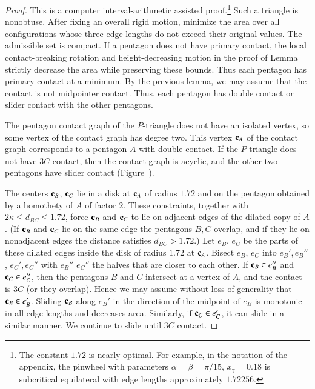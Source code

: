 \begin{proof} This is a computer interval-arithmetic assisted proof.\footnote{The constant
    $1.72$ is nearly optimal.  For example, in the notation of the
    appendix, the pinwheel with parameters $\alpha=\beta=\pi/15$,
    $x_\gamma = 0.18$ is subcritical equilateral with edge lengths
    approximately $1.72256$.} Such a triangle is nonobtuse.  After
  fixing an overall rigid motion, minimize the area over all configurations
  whose three edge lengths do not exceed their original values. The
  admissible set is compact. If a pentagon does not have primary contact,
  the local contact-breaking rotation and height-decreasing motion in the
  proof of Lemma~ strictly decrease the area while
  preserving these bounds. Thus each pentagon has primary contact at a
  minimum.
  By the previous lemma, we may assume that the
  contact is not midpointer contact.  Thus, each pentagon has double
  contact or slider contact with the other pentagons.

  The pentagon contact graph of the $P$-triangle does not have an isolated vertex, so some
  vertex of the contact graph has degree two. This vertex ${\mathbf c}_A$ of the
  contact graph corresponds to a pentagon $A$ with double contact.  If the
  $P$-triangle does not have $3C$ contact, then the contact graph is
  acyclic, and the other two pentagons have slider contact
  (Figure~).

  The centers ${\mathbf c}_B$, ${\mathbf c}_C$ lie in a disk at ${\mathbf c}_A$ of radius $1.72$ and
  on the pentagon obtained by a homothety of $A$ of factor $2$.  These
  constraints, together with $2\kappa\le d_{BC}\le1.72$, force ${\mathbf c}_B$
  and ${\mathbf c}_C$ to lie on adjacent edges of the dilated copy of $A$.  (If
  ${\mathbf c}_B$ and ${\mathbf c}_C$ lie on the same edge the pentagons $B,C$ overlap, and if they
  lie on nonadjacent edges the distance satisfies $d_{BC}>1.72$.) Let
  $e_B$, $e_C$ be the parts of these dilated edges inside the disk of
  radius $1.72$ at ${\mathbf c}_A$.  Bisect $e_B$, $e_C$ into $e_B',e_B''$,
  $e_C',e_C''$ with $e_B''$ $e_C''$ the halves that are closer to each
  other.  If ${\mathbf c}_B\in e_B''$ and ${\mathbf c}_C\in e_C''$, then the pentagons $B$
  and $C$ intersect at a vertex of $A$, and the contact is $3C$ (or
  they overlap).  Hence we may assume without loss of generality that
  ${\mathbf c}_B\in e_B'$.  Sliding ${\mathbf c}_B$ along $e_B'$ in the direction of the
  midpoint of $e_B$ is monotonic in all edge lengths and decreases
  area.  Similarly, if ${\mathbf c}_C\in e_C'$, it can slide in a similar
  manner.  We continue to slide until $3C$ contact.


\end{proof}
